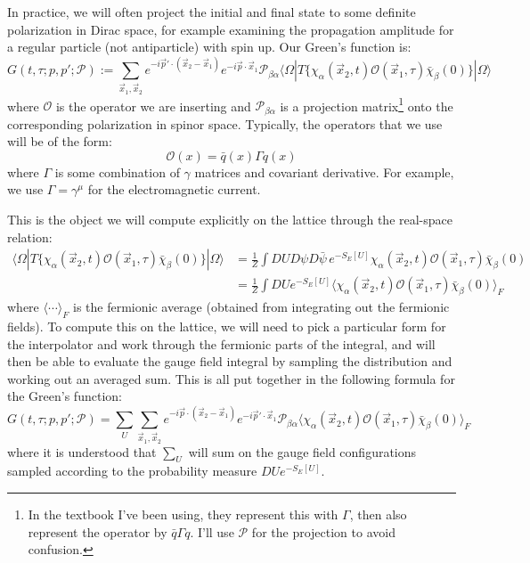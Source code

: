 \documentclass[11pt, oneside]{article}   	%
\theoremstyle{definition}
\begin{document}
In practice, we will often project the initial and final state to some definite polarization in Dirac space, for example examining  
the propagation amplitude for a regular particle (not antiparticle) with spin up. Our Green's function is:
\begin{equation}
	G(t, \tau; p, p'; \mathcal P) := \sum_{\vec x_1, \vec x_2} e^{-i\vec p'\cdot (\vec x_2 - \vec x_1)}e^{-i\vec p\cdot\vec x_1}\mathcal P_{\beta\alpha}
	\langle\Omega | T\{\chi_\alpha(\vec x_2, t)\mathcal O (\vec x_1, \tau)\bar\chi_\beta(0)\}| \Omega\rangle
\end{equation}
where $\mathcal O$ is the operator we are inserting and $\mathcal P_{\beta\alpha}$ is a projection matrix\footnote{In the textbook I've been using, 
they represent this with $\Gamma$, then also represent the operator by $\bar q\Gamma q$. I'll use $\mathcal P$ for the projection to avoid 
confusion.} onto the corresponding polarization in 
spinor space. Typically, the operators that we use will be of the form:
\begin{equation}
	\mathcal O(x) = \bar q(x) \Gamma q(x)
\end{equation}
where $\Gamma$ is some combination of $\gamma$ matrices and covariant derivative. For example, we use $\Gamma = \gamma^\mu$ for the 
electromagnetic current. 

This is the object we will compute explicitly on the lattice through the real-space relation:
\begin{align}
	\langle\Omega | T\{\chi_\alpha(\vec x_2, t)\mathcal O(\vec x_1, \tau)\bar\chi_\beta(0)\} |\Omega\rangle &= \frac{1}{Z}\int DU D\psi D\bar\psi
	\,e^{-S_E[U]}\chi_\alpha(\vec x_2, t)\mathcal O(\vec x_1, \tau)\bar\chi_\beta(0) \\
	&= \frac{1}{Z}\int DU e^{-S_E[U]} \langle\chi_\alpha(\vec x_2, t)\mathcal O(\vec x_1, \tau)\bar\chi_\beta(0)\rangle_F
\end{align}
where $\langle\cdots\rangle_F$ is the fermionic average (obtained from integrating out the fermionic fields). 
To compute this on the lattice, we will need to pick a particular form for the interpolator and work through the fermionic parts of the integral, and 
will then be able to evaluate the gauge field integral by sampling the distribution and working out an averaged sum. This is all put together in the 
following formula for the Green's function:
\begin{equation}
	G(t, \tau; p, p'; \mathcal P) = \sum_U\sum_{\vec x_1, \vec x_2} e^{-i\vec p\cdot (\vec x_2 - \vec x_1)} e^{-i\vec p'\cdot\vec 
	x_1}\mathcal P_{\beta\alpha}\langle\chi_\alpha(\vec x_2, t)\mathcal O(\vec x_1, \tau)\bar\chi_\beta(0)\rangle_F~
	\label{eq:greens_fn_reduced}
\end{equation}
where it is understood that $\sum_U$ will sum on the gauge field configurations sampled according to the probability measure $DU e^{-S_E[U]}$. 
\end{document}

